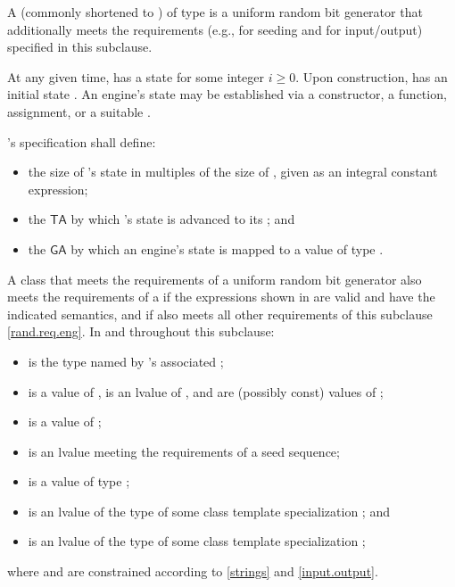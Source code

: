 \pnum
A 
(commonly shortened to )
 of type 
is a uniform random bit generator
that additionally meets the requirements
(e.g., for seeding and for input/output)
specified in this subclause.

\pnum
At any given time,
 has a state 
for some integer $i \geq 0$.
Upon construction,
has an initial state .
An engine's state may be established via
 a constructor,
 a  function,
 assignment,
 or a suitable .

\pnum
{}'s specification shall define:
\begin{itemize}
 \item
   the size of 's state
   in multiples of the size of ,
   given as an integral constant expression;
 \item
   the 
   $\mathsf{TA}$
   by which 's state 
   is advanced to its 
   ;
 and
 \item
   the 
   $\mathsf{GA}$
   by which an engine's state is mapped
   to a value of type .
\end{itemize}

\pnum
A class 
that meets the requirements
of a uniform random bit generator
also meets the requirements
of a 
if the expressions shown
in 
are valid and have the indicated semantics,
and if  also meets all other requirements
of this subclause \ref{rand.req.eng}.
In  and throughout this subclause:
\begin{itemize}
  \item
     is the type named by
    's associated ;
  \item
     is a value of ,
     is an lvalue of ,
     and  are (possibly const) values of ;
  \item
     is a value of ;
  \item
     is an lvalue
    meeting the requirements of a seed sequence;
  \item
     is a value
    of type ;
  \item
     is an lvalue of the type of some class template specialization
     ;
  and
  \item
     is an lvalue of the type of some class template specialization
     ;
\end{itemize}
where  and  are constrained
according to \ref{strings} and \ref{input.output}.

